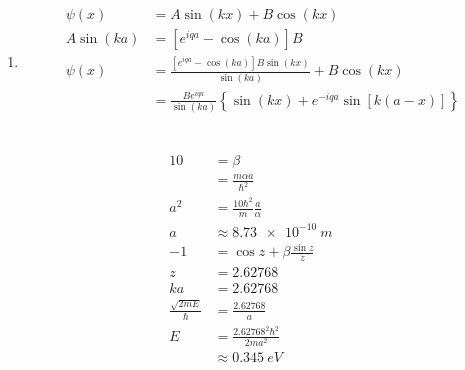 \documentclass{article}
\begin{document}
\begin{enumerate}
  \item

        \begin{align*}
          \psi(x)      & = A \sin (k x) + B \cos (k x)                                                              \\
          A \sin (k a) & = [e^{i q a} - \cos (k a)] B                                                               \\
          \psi(x)      & = \frac{[e^{i q a} - \cos (k a)] B \sin (k x)}{\sin (k a)} + B \cos (k x)                  \\
                       & = \frac{B e^{i q a}}{\sin (k a)} \left\{ \sin (k x) + e^{-i q a} \sin [k (a - x)] \right\} \\
        \end{align*}
\end{enumerate}

\subsection{}

\begin{align*}
  10                         & = \beta                                 \\
                             & = \frac{m \alpha a}{\hbar^2}            \\
  a^2                        & = \frac{10 \hbar^2}{m} \frac{a}{\alpha} \\
  a                          & \approx \qty{8.73e-10}{m}               \\
  -1                         & = \cos z + \beta \frac{\sin z}{z}       \\
  z                          & = 2.62768                               \\
  k a                        & = 2.62768                               \\
  \frac{\sqrt{2 m E}}{\hbar} & = \frac{2.62768}{a}                     \\
  E                          & = \frac{2.62768^2 \hbar^2}{2 m a^2}     \\
                             & \approx \qty{0.345}{eV}
\end{align*}

\setcounter{subsection}{28}
\subsection{}
\end{document}
